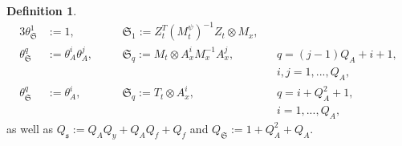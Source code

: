 \documentclass{article}
\theoremstyle{plain}
\theoremstyle{definition}
\newtheorem{definition}[theorem]{Definition}
\theoremstyle{remark}
\begin{document}
\begin{definition}
\begin{alignat}{3}
\theta_{\mathfrak{S}}^{1} &:= 1, &&\mathfrak{S}_{1} := Z_t^T (M_t^\psi)^{-1} Z_t \otimes M_{x}, && \\
\theta_{\mathfrak{S}}^{q} &:= \theta_{A}^{i}\theta_{A}^{j}, \quad && \mathfrak{S}_{q} := M_{t} \otimes A_{x}^{i} M_{x}^{-1} A_{x}^{j}, \quad &&q = (j-1)Q_{A} + i + 1,\\
& && &&i,j = 1, ..., Q_{A}, \nonumber \\
\theta_{\mathfrak{S}}^{q} &:= \theta_{A}^{i}, && \mathfrak{S}_{q} := T_{t} \otimes A_{x}^{i}, &&q = i + Q_{A}^{2} + 1,\label{eq:offlineoperatorend}\\
& && &&i = 1, ..., Q_{A}, \nonumber
\end{alignat}
as well as $Q_{\mathfrak{s}} := Q_{A}Q_y + Q_{A}Q_{f} + Q_{f}$ and $Q_{\mathfrak{S}} := 1 + Q_{A}^{2} + Q_{A}$.
\end{definition}
\end{document}
